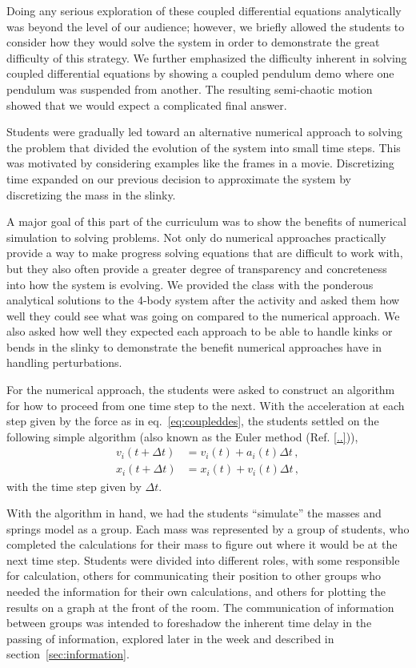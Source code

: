 \documentclass[aps,pre,10pt,superscriptaddress,showpacs,amsmath,amssymb,nofootinbib]{revtex4-1}
\newcommand{\eq}[1]{eq.~\eqref{eq:#1}}
\renewcommand{\sec}[1]{section~\ref{sec:#1}}
\newcommand{\nn}{\nonumber}
\begin{document}
Doing any serious exploration of these coupled differential equations
analytically was beyond the level of our audience; however, we briefly allowed
the students to consider how they would solve the system in order to demonstrate
the great difficulty of this strategy. We further emphasized the difficulty inherent in
solving coupled differential equations by showing a coupled pendulum demo where
one pendulum was suspended from another. The resulting semi-chaotic motion
showed that we would expect a complicated final answer.

Students were gradually led toward an alternative numerical approach to solving
the problem that divided the evolution of the system into small time
steps. This was motivated by considering examples like the frames in a
movie. Discretizing time expanded on our previous decision to approximate the
system by discretizing the mass in the slinky.

A major goal of this part of the curriculum was to show the benefits of
numerical simulation to solving problems. Not only do numerical approaches
practically provide a way to make progress solving equations that are difficult
to work with, but they also often provide a greater degree of transparency and
concreteness into how the system is evolving. We provided the class with the
ponderous analytical solutions to the 4-body system after the activity and asked
them how well they could see what was going on compared to the numerical
approach. We also asked how well they expected each approach to be able to
handle kinks or bends in the slinky to demonstrate the benefit numerical
approaches have in handling perturbations.

For the numerical approach, the students were asked to construct an algorithm
for how to proceed from one time step to the next. With the acceleration at each
step given by the force as in \eq{coupleddes}, the students settled on the
following simple algorithm (also known as the Euler method (Ref. \ref{..})),
\begin{align} \label{eq:algorithm}
v_i(t+\Delta t) &= v_i(t) + a_i(t)\Delta t
\,,\nn\\
x_i(t+\Delta t) &= x_i(t) + v_i(t)\Delta t
\,,\end{align}
with the time step given by $\Delta t$.

With the algorithm in hand, we had the students ``simulate'' the masses and
springs model as a group. Each mass was represented by a group of 
students, who completed the calculations for their mass to figure out where it would be
at the next time step. Students were divided into different roles, with some responsible 
for calculation, others for communicating their position to other groups who 
needed the information for their own calculations, and others for plotting the results on a graph 
at the front of the room. The communication of information between groups was intended 
to foreshadow the inherent time delay in the passing of information, explored later in
the week and described in \sec{information}.
\end{document}
